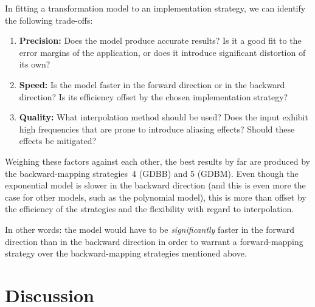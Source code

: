 \documentclass[english,12pt]{ifimaster}
\begin{document}
In fitting a transformation model to an implementation strategy, we
can identify the following trade-offs:
\begin{enumerate}
\item \textbf{Precision:} Does the model produce accurate results? Is
  it a good fit to the error margins of the application, or does it
  introduce significant distortion of its own?
\item \textbf{Speed:} Is the model faster in the forward direction or
  in the backward direction? Is its efficiency offset by the chosen
  implementation strategy?
\item \textbf{Quality:} What interpolation method should be used? Does
  the input exhibit high frequencies that are prone to introduce
  aliasing effects? Should these effects be mitigated?
\end{enumerate}
Weighing these factors against each other, the best results by far are
produced by the backward-mapping strategies~4 (GDBB) and 5 (GDBM).
Even though the exponential model is slower in the backward direction
(and this is even more the case for other models, such as the
polynomial model), this is more than offset by the efficiency of the
strategies and the flexibility with regard to interpolation.

In other words: the model would have to be \emph{significantly} faster
in the forward direction than in the backward direction in order to
warrant a forward-mapping strategy over the backward-mapping
strategies mentioned above.


\section{Discussion}
\end{document}

